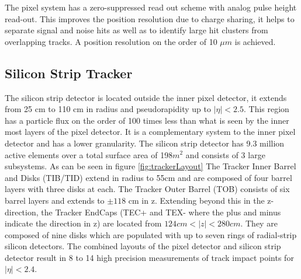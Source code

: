 The pixel system has a zero-suppressed read out scheme with analog pulse
height read-out. This improves the position resolution due to charge sharing,
it helps to separate signal and noise hits as well as to identify large hit 
clusters from overlapping tracks.
A position resolution on the order of 10 $\mu m$ is achieved.

\subsection{Silicon Strip Tracker}
The silicon strip detector is located outside the inner pixel detector, 
it extends from 25 cm to 110 cm in radius and pseudorapidity up to $|\eta|<2.5$. 
This region has a particle flux on 
the order of 100 times less than what is seen by the inner most layers of 
the pixel detector. It is a complementary system to the inner pixel
detector and has a lower granularity. The silicon strip detector 
has 9.3 million active elements over a total surface area of 198$m^{2}$
and consists of 3 large subsystems. As can be seen in figure \ref{fig:trackerLayout}
The Tracker Inner Barrel and Disks (TIB/TID) extend in radius to
55cm and are composed of four barrel layers with three disks at each.
The Tracker Outer Barrel (TOB) consists of six barrel layers and extends to $\pm118$ cm
in z. Extending beyond this in the z-direction, the Tracker EndCaps (TEC+ and TEX- where the plus and minus
indicate the direction in z) are located from $124cm<|z|<280cm$. They are composed of 
nine disks which are populated with up to seven rings of radial-strip silicon detectors.
The combined layouts of the pixel detector and silicon strip detector
result in 8 to 14 high precision measurements of track impact points for 
$|\eta|<2.4$.